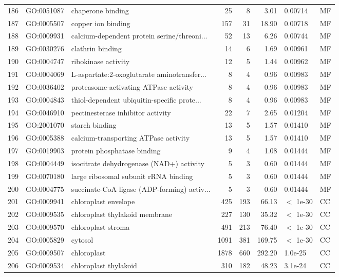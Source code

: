 \documentclass[12pt,oneside,a4paper]{article}
\begin{document}
\begin{longtable}{rllrrrll}
  186 & GO:0051087 & chaperone binding &  25 &   8 & 3.01 & 0.00714 & MF \\ 
  187 & GO:0005507 & copper ion binding & 157 &  31 & 18.90 & 0.00718 & MF \\ 
  188 & GO:0009931 & calcium-dependent protein serine/threoni... &  52 &  13 & 6.26 & 0.00744 & MF \\ 
  189 & GO:0030276 & clathrin binding &  14 &   6 & 1.69 & 0.00961 & MF \\ 
  190 & GO:0004747 & ribokinase activity &  12 &   5 & 1.44 & 0.00962 & MF \\ 
  191 & GO:0004069 & L-aspartate:2-oxoglutarate aminotransfer... &   8 &   4 & 0.96 & 0.00983 & MF \\ 
  192 & GO:0036402 & proteasome-activating ATPase activity &   8 &   4 & 0.96 & 0.00983 & MF \\ 
  193 & GO:0004843 & thiol-dependent ubiquitin-specific prote... &   8 &   4 & 0.96 & 0.00983 & MF \\ 
  194 & GO:0046910 & pectinesterase inhibitor activity &  22 &   7 & 2.65 & 0.01204 & MF \\ 
  195 & GO:2001070 & starch binding &  13 &   5 & 1.57 & 0.01410 & MF \\ 
  196 & GO:0005388 & calcium-transporting ATPase activity &  13 &   5 & 1.57 & 0.01410 & MF \\ 
  197 & GO:0019903 & protein phosphatase binding &   9 &   4 & 1.08 & 0.01444 & MF \\ 
  198 & GO:0004449 & isocitrate dehydrogenase (NAD+) activity &   5 &   3 & 0.60 & 0.01444 & MF \\ 
  199 & GO:0070180 & large ribosomal subunit rRNA binding &   5 &   3 & 0.60 & 0.01444 & MF \\ 
  200 & GO:0004775 & succinate-CoA ligase (ADP-forming) activ... &   5 &   3 & 0.60 & 0.01444 & MF \\ 
  201 & GO:0009941 & chloroplast envelope & 425 & 193 & 66.13 & $<$ 1e-30 & CC \\ 
  202 & GO:0009535 & chloroplast thylakoid membrane & 227 & 130 & 35.32 & $<$ 1e-30 & CC \\ 
  203 & GO:0009570 & chloroplast stroma & 491 & 213 & 76.40 & $<$ 1e-30 & CC \\ 
  204 & GO:0005829 & cytosol & 1091 & 381 & 169.75 & $<$ 1e-30 & CC \\ 
  205 & GO:0009507 & chloroplast & 1878 & 660 & 292.20 & 1.0e-25 & CC \\ 
  206 & GO:0009534 & chloroplast thylakoid & 310 & 182 & 48.23 & 3.1e-24 & CC \\ 

\end{longtable}
\end{document}

